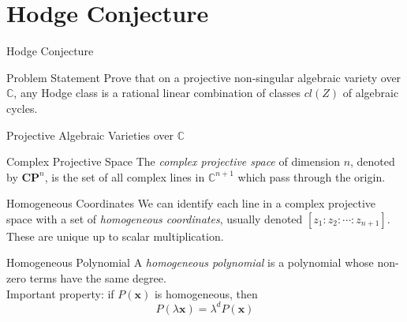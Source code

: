 \documentclass[handout]{beamer}
\newcommand{\Complex}{\mathbb{C}}
\newcommand{\CP}{\mathbf{CP}}
\renewcommand{\vec}[1]{\mathbf{#1}}
\begin{document}
  \section{Hodge Conjecture}
  \begin{frame}{Hodge Conjecture}
      \begin{block}{Problem Statement}
          Prove that on a projective non-singular algebraic variety over
          $\Complex$, any Hodge class is a rational linear combination of
          classes $cl(Z)$ of algebraic cycles.
      \end{block}
  \end{frame}
  \begin{frame}{Projective Algebraic Varieties over $\Complex$}
      \pause
      \begin{block}{Complex Projective Space}
          The \textit{complex projective space} of dimension $n$, denoted by
          $\CP^n$, is the set of all \alert{complex} lines in $\Complex^{n+1}$
          which pass through the origin.
      \end{block}
      \pause
      \begin{block}{Homogeneous Coordinates}
          We can identify each line in a complex projective space with a set of
          \textit{homogeneous coordinates}, usually denoted $[z_1 : z_2 :
          \cdots : z_{n+1}]$. These are unique up to scalar multiplication.
      \end{block}
      \pause
      \begin{block}{Homogeneous Polynomial}
          A \textit{homogeneous polynomial} is a polynomial whose non-zero
          terms have the same degree.
          \pause\\
          Important property: if $P(\vec{x})$ is homogeneous, then
          $$P(\lambda\vec{x}) = \lambda^d P(\vec{x})$$
      \end{block}
  \end{frame}
\end{document}
